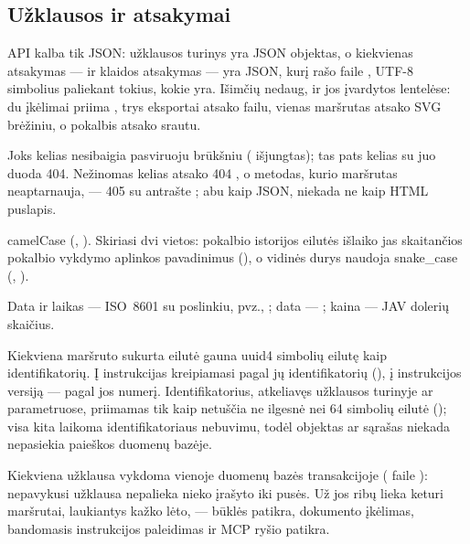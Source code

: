 \subsection{Užklausos ir atsakymai}\label{sec:api:json}

API kalba tik JSON: užklausos turinys yra JSON objektas, o kiekvienas atsakymas --- ir klaidos
atsakymas --- yra JSON, kurį rašo  faile , UTF-8 simbolius
paliekant tokius, kokie yra. Išimčių nedaug, ir jos įvardytos lentelėse: du įkėlimai priima
, trys eksportai atsako failu, vienas maršrutas atsako SVG brėžiniu, o
pokalbis atsako srautu.

\begin{description}[style=unboxed, leftmargin=0pt]
  \item[Keliai.] Joks kelias nesibaigia pasviruoju brūkšniu ( išjungtas); tas
    pats kelias su juo duoda 404. Nežinomas kelias atsako 404 , o metodas, kurio
    maršrutas neaptarnauja, --- 405  su antrašte ; abu kaip
    JSON, niekada ne kaip HTML puslapis.
  \item[Laukų pavadinimai.] camelCase (, ). Skiriasi dvi vietos:
    pokalbio istorijos eilutės išlaiko jas skaitančios pokalbio vykdymo aplinkos pavadinimus
    (), o vidinės durys naudoja snake\_case (, ).
  \item[Reikšmės.] Data ir laikas --- ISO~8601 su poslinkiu, pvz., ;
    data --- ; kaina --- JAV dolerių skaičius.
  \item[Identifikatoriai.] Kiekviena maršruto sukurta eilutė gauna uuid4 simbolių eilutę kaip
    identifikatorių. Į instrukcijas kreipiamasi pagal jų identifikatorių (), į
    instrukcijos versiją --- pagal jos numerį. Identifikatorius, atkeliavęs užklausos turinyje ar
    parametruose, priimamas tik kaip netuščia ne ilgesnė nei 64 simbolių eilutė ();
    visa kita laikoma identifikatoriaus nebuvimu, todėl objektas ar sąrašas niekada nepasiekia
    paieškos duomenų bazėje.
  \item[Transakcijos.] Kiekviena užklausa vykdoma vienoje duomenų bazės transakcijoje
    ( faile ): nepavykusi užklausa nepalieka nieko
    įrašyto iki pusės. Už jos ribų lieka keturi maršrutai, laukiantys kažko lėto, --- būklės
    patikra, dokumento įkėlimas, bandomasis instrukcijos paleidimas ir MCP ryšio patikra.
\end{description}


